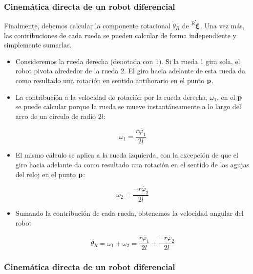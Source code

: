 \begin{frame}
    \frametitle{Cinemática directa de un robot diferencial}
    \footnotesize

    Finalmente, debemos calcular la componente rotacional $\dot{\theta}_{R}$ de $\dot{\prescript{\mathrm{R}}{}{{\boldsymbol{\mathbf{\xi}}}_\mathrm{}}}$. Una vez más, las contribuciones de cada rueda se pueden calcular de forma independiente y simplemente sumarlas. 
    
    \begin{itemize}
        \item Consideremos la rueda derecha (denotada con 1). Si la rueda 1 gira sola, el robot pivota alrededor de la rueda 2. El giro hacia adelante de esta rueda da como resultado una rotación en sentido antihorario en el punto $\boldsymbol{\mathbf{p}}$.
        
        \item La contribución a la velocidad de rotación por la rueda derecha, $\omega_{1}$, en el $\boldsymbol{\mathbf{p}}$ se puede calcular porque la rueda se mueve instantáneamente a lo largo del arco de un círculo de radio $2l$:
        
        \begin{equation*}
            \omega_{1} = \dfrac{r\dot{\varphi_{1}}}{2l}
        \end{equation*}
        
        \item El mismo cálculo se aplica a la rueda izquierda, con la excepción de que el giro hacia adelante da como resultado una rotación en el sentido de las agujas del reloj en el punto $\boldsymbol{\mathbf{p}}$:
        
        \begin{equation*}
            \omega_{2} = \dfrac{-r\dot{\varphi_{2}}}{2l}
        \end{equation*}
    
        \item Sumando la contribución de cada rueda, obtenemos la velocidad angular del robot
        
        \begin{equation*}
            \dot{\theta}_{R} = \omega_{1} + \omega_{2} = \dfrac{r\dot{\varphi_{1}}}{2l} + \dfrac{-r\dot{\varphi_{2}}}{2l}
        \end{equation*}
    
    \end{itemize}


\end{frame}

\begin{frame}
    \frametitle{Cinemática directa de un robot diferencial}
    
    
    

\end{frame}

